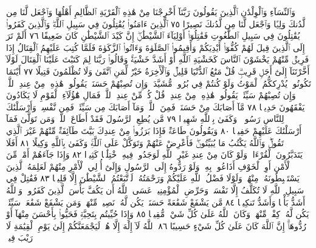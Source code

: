وَٱلنِّسَآءِ وَٱلْوِلْدَٰنِ ٱلَّذِينَ يَقُولُونَ رَبَّنَآ أَخْرِجْنَا مِنْ هَٰذِهِ ٱلْقَرْيَةِ ٱلظَّالِمِ
أَهْلُهَا وَٱجْعَل لَّنَا مِن لَّدُنكَ وَلِيࣰّا وَٱجْعَل لَّنَا مِن لَّدُنكَ نَصِيرًا ٧٥
ٱلَّذِينَ ءَامَنُوا۟ يُقَٰتِلُونَ فِي سَبِيلِ ٱللَّهِۖ وَٱلَّذِينَ كَفَرُوا۟ يُقَٰتِلُونَ فِي
سَبِيلِ ٱلطَّٰغُوتِ فَقَٰتِلُوٓا۟ أَوْلِيَآءَ ٱلشَّيْطَٰنِۖ إِنَّ كَيْدَ ٱلشَّيْطَٰنِ
كَانَ ضَعِيفًا ٧٦ أَلَمْ تَرَ إِلَى ٱلَّذِينَ قِيلَ لَهُمْ كُفُّوٓا۟ أَيْدِيَكُمْ وَأَقِيمُوا۟
ٱلصَّلَوٰةَ وَءَاتُوا۟ ٱلزَّكَوٰةَ فَلَمَّا كُتِبَ عَلَيْهِمُ ٱلْقِتَالُ إِذَا فَرِيقࣱ مِّنْهُمْ
يَخْشَوْنَ ٱلنَّاسَ كَخَشْيَةِ ٱللَّهِ أَوْ أَشَدَّ خَشْيَةࣰۚ وَقَالُوا۟ رَبَّنَا لِمَ كَتَبْتَ
عَلَيْنَا ٱلْقِتَالَ لَوْلَآ أَخَّرْتَنَآ إِلَىٰٓ أَجَلࣲ قَرِيبࣲۗ قُلْ مَتَٰعُ ٱلدُّنْيَا قَلِيلࣱ
وَٱلْأٓخِرَةُ خَيْرࣱ لِّمَنِ ٱتَّقَىٰ وَلَا تُظْلَمُونَ فَتِيلًا ٧٧ أَيْنَمَا تَكُونُوا۟
يُدْرِككُّمُ ٱلْمَوْتُ وَلَوْ كُنتُمْ فِي بُرُوجࣲ مُّشَيَّدَةࣲۗ وَإِن تُصِبْهُمْ حَسَنَةࣱ
يَقُولُوا۟ هَٰذِهِۦ مِنْ عِندِ ٱللَّهِۖ وَإِن تُصِبْهُمْ سَيِّئَةࣱ يَقُولُوا۟ هَٰذِهِۦ مِنْ
عِندِكَۚ قُلْ كُلࣱّ مِّنْ عِندِ ٱللَّهِۖ فَمَالِ هَٰٓؤُلَآءِ ٱلْقَوْمِ لَا يَكَادُونَ يَفْقَهُونَ
حَدِيثࣰا ٧٨ مَّآ أَصَابَكَ مِنْ حَسَنَةࣲ فَمِنَ ٱللَّهِۖ وَمَآ أَصَابَكَ مِن سَيِّئَةࣲ
فَمِن نَّفْسِكَۚ وَأَرْسَلْنَٰكَ لِلنَّاسِ رَسُولࣰاۚ وَكَفَىٰ بِٱللَّهِ شَهِيدࣰا ٧٩
مَّن يُطِعِ ٱلرَّسُولَ فَقَدْ أَطَاعَ ٱللَّهَۖ وَمَن تَوَلَّىٰ فَمَآ أَرْسَلْنَٰكَ
عَلَيْهِمْ حَفِيظࣰا ٨٠ وَيَقُولُونَ طَاعَةࣱ فَإِذَا بَرَزُوا۟ مِنْ عِندِكَ
بَيَّتَ طَآئِفَةࣱ مِّنْهُمْ غَيْرَ ٱلَّذِي تَقُولُۖ وَٱللَّهُ يَكْتُبُ مَا يُبَيِّتُونَۖ
فَأَعْرِضْ عَنْهُمْ وَتَوَكَّلْ عَلَى ٱللَّهِۚ وَكَفَىٰ بِٱللَّهِ وَكِيلًا ٨١
أَفَلَا يَتَدَبَّرُونَ ٱلْقُرْءَانَۚ وَلَوْ كَانَ مِنْ عِندِ غَيْرِ ٱللَّهِ
لَوَجَدُوا۟ فِيهِ ٱخْتِلَٰفࣰا كَثِيرࣰا ٨٢ وَإِذَا جَآءَهُمْ أَمْرࣱ مِّنَ ٱلْأَمْنِ
أَوِ ٱلْخَوْفِ أَذَاعُوا۟ بِهِۦۖ وَلَوْ رَدُّوهُ إِلَى ٱلرَّسُولِ وَإِلَىٰٓ أُو۟لِي ٱلْأَمْرِ
مِنْهُمْ لَعَلِمَهُ ٱلَّذِينَ يَسْتَنۢبِطُونَهُۥ مِنْهُمْۗ وَلَوْلَا فَضْلُ ٱللَّهِ
عَلَيْكُمْ وَرَحْمَتُهُۥ لَٱتَّبَعْتُمُ ٱلشَّيْطَٰنَ إِلَّا قَلِيلࣰا ٨٣
فَقَٰتِلْ فِي سَبِيلِ ٱللَّهِ لَا تُكَلَّفُ إِلَّا نَفْسَكَۚ وَحَرِّضِ ٱلْمُؤْمِنِينَۖ
عَسَى ٱللَّهُ أَن يَكُفَّ بَأْسَ ٱلَّذِينَ كَفَرُوا۟ۚ وَٱللَّهُ أَشَدُّ بَأْسࣰا
وَأَشَدُّ تَنكِيلࣰا ٨٤ مَّن يَشْفَعْ شَفَٰعَةً حَسَنَةࣰ يَكُن لَّهُۥ
نَصِيبࣱ مِّنْهَاۖ وَمَن يَشْفَعْ شَفَٰعَةࣰ سَيِّئَةࣰ يَكُن لَّهُۥ كِفْلࣱ مِّنْهَاۗ
وَكَانَ ٱللَّهُ عَلَىٰ كُلِّ شَيْءࣲ مُّقِيتࣰا ٨٥ وَإِذَا حُيِّيتُم بِتَحِيَّةࣲ فَحَيُّوا۟
بِأَحْسَنَ مِنْهَآ أَوْ رُدُّوهَآۗ إِنَّ ٱللَّهَ كَانَ عَلَىٰ كُلِّ شَيْءٍ حَسِيبًا ٨٦
ٱللَّهُ لَآ إِلَٰهَ إِلَّا هُوَۚ لَيَجْمَعَنَّكُمْ إِلَىٰ يَوْمِ ٱلْقِيَٰمَةِ لَا رَيْبَ فِيهِۗ
